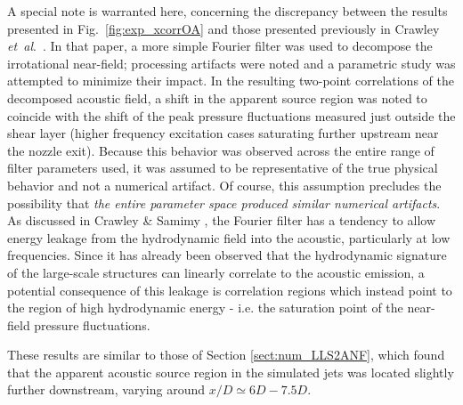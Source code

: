 \documentclass[english]{aiaa-tc}
\newcommand*{\fig}[1]{Fig.~\ref{#1}}
\newcommand*{\etal}{\textit{et~al}.\ }
\begin{document}
A special note is warranted here, concerning the discrepancy between the results presented in \fig{fig:exp_xcorrOA} and those presented previously in Crawley \etal \cite{Crawley2015}.
In that paper, a more simple Fourier filter was used to decompose the irrotational near-field; processing artifacts were noted and a parametric study was attempted to minimize their impact.
In the resulting two-point correlations of the decomposed acoustic field, a shift in the apparent source region was noted to coincide with the shift of the peak pressure fluctuations measured just outside the shear layer (higher frequency excitation cases saturating further upstream near the nozzle exit).
Because this behavior was observed across the entire range of filter parameters used, it was assumed to be representative of the true physical behavior and not a numerical artifact.
Of course, this assumption precludes the possibility that \textit{the entire parameter space produced similar numerical artifacts}. 
As discussed in Crawley \& Samimy \cite{Crawley2016}, the Fourier filter has a tendency to allow energy leakage from the hydrodynamic field into the acoustic, particularly at low frequencies. 
Since it has already been observed that the hydrodynamic signature of the large-scale structures can linearly correlate to the acoustic emission, a potential consequence of this leakage is correlation regions which instead point to the region of high hydrodynamic energy - i.e. the saturation point of the near-field pressure fluctuations.

These results are similar to those of Section \ref{sect:num_LLS2ANF}, which found that the apparent acoustic source region in the simulated jets was located slightly further downstream, varying around $x/D \simeq 6D - 7.5D$.
\end{document}
